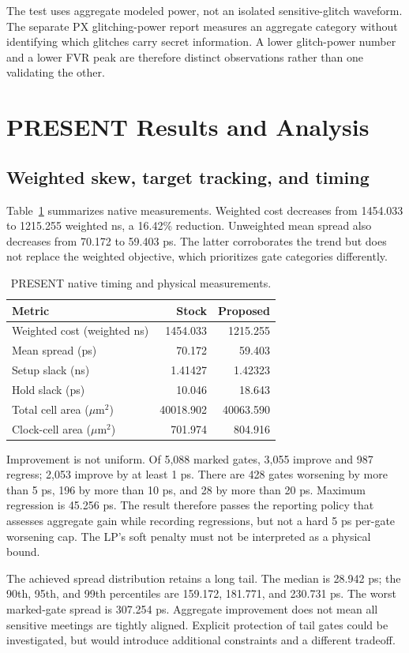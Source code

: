 \documentclass[conference]{IEEEtran}
\begin{document}
The test uses aggregate modeled power, not an isolated sensitive-glitch waveform. The separate PX glitching-power report measures an aggregate category without identifying which glitches carry secret information. A lower glitch-power number and a lower FVR peak are therefore distinct observations rather than one validating the other.

\section{PRESENT Results and Analysis}
\subsection{Weighted skew, target tracking, and timing}
Table~\ref{tab:native} summarizes native measurements. Weighted cost decreases from 1454.033 to 1215.255 weighted ns, a 16.42\% reduction. Unweighted mean spread also decreases from 70.172 to 59.403 ps. The latter corroborates the trend but does not replace the weighted objective, which prioritizes gate categories differently.
\begin{table}[!t]
\caption{PRESENT native timing and physical measurements.}\label{tab:native}
\centering\begin{tabular}{lrr}\hline
Metric & Stock & Proposed\\\hline
Weighted cost (weighted ns) & 1454.033 & 1215.255\\
Mean spread (ps) & 70.172 & 59.403\\
Setup slack (ns) & 1.41427 & 1.42323\\
Hold slack (ps) & 10.046 & 18.643\\
Total cell area ($\mu$m$^2$) & 40018.902 & 40063.590\\
Clock-cell area ($\mu$m$^2$) & 701.974 & 804.916\\\hline
\end{tabular}
\end{table}

Improvement is not uniform. Of 5,088 marked gates, 3,055 improve and 987 regress; 2,053 improve by at least 1 ps. There are 428 gates worsening by more than 5 ps, 196 by more than 10 ps, and 28 by more than 20 ps. Maximum regression is 45.256 ps. The result therefore passes the reporting policy that assesses aggregate gain while recording regressions, but not a hard 5 ps per-gate worsening cap. The LP's soft penalty must not be interpreted as a physical bound.

The achieved spread distribution retains a long tail. The median is 28.942 ps; the 90th, 95th, and 99th percentiles are 159.172, 181.771, and 230.731 ps. The worst marked-gate spread is 307.254 ps. Aggregate improvement does not mean all sensitive meetings are tightly aligned. Explicit protection of tail gates could be investigated, but would introduce additional constraints and a different tradeoff.
\end{document}
